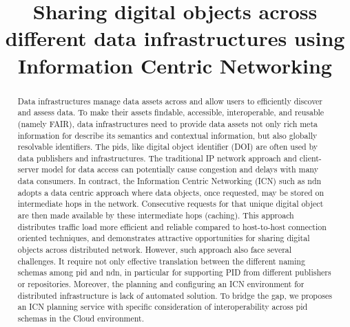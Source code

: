 \documentclass[conference]{IEEEtran}
\begin{document}
\title{Sharing digital objects across different data infrastructures using Information Centric Networking
}

\author{
}

\maketitle

\begin{abstract}
Data infrastructures manage data assets across and allow users to efficiently discover and assess data. To make their assets findable, accessible, interoperable, and reusable (namely FAIR), data infrastructures need to provide data assets not only rich meta information for describe its semantics and contextual information, but also globally resolvable identifiers. The \glspl{pid}, like digital object identifier (DOI) are often used by data publishers and infrastructures. The traditional IP network approach and client-server model for data access can potentially cause congestion and delays with many data consumers. In contract, the Information Centric Networking (ICN) such as \gls{ndn} adopts a data centric approach where data objects, once requested, may be stored on intermediate hops in the network. Consecutive requests for that unique digital object are then made available by these intermediate hops (caching). This approach distributes traffic load more efficient and reliable compared to host-to-host connection oriented techniques, and demonstrates attractive opportunities for sharing digital objects across distributed network. However, such approach also face several challenges. It require not only effective translation between the different naming schemas among \gls{pid} and \gls{ndn}, in particular for supporting PID from different publishers or repositories. Moreover, the planning and configuring an ICN environment for distributed infrastructure is lack of automated solution. To bridge the gap, we proposes an ICN planning service with specific consideration of interoperability across \gls{pid} schemas in the Cloud environment.


\end{abstract}
\end{document}

